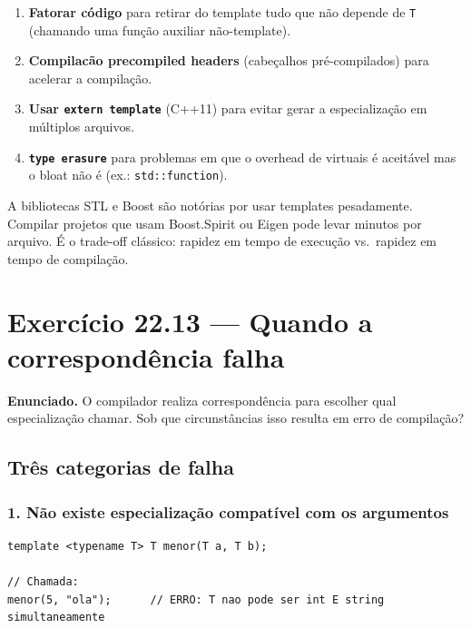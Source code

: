 \documentclass[11pt,a4paper]{article}
\begin{document}
\begin{enumerate}[leftmargin=*,itemsep=0pt]
  \item \textbf{Fatorar c\'odigo} para retirar do template tudo que n\~ao depende de \texttt{T} (chamando uma fun\c{c}\~ao auxiliar n\~ao-template).
  \item \textbf{Compilac\~ao precompiled headers} (cabe\c{c}alhos pr\'e-compilados) para acelerar a compila\c{c}\~ao.
  \item \textbf{Usar \texttt{extern template}} (C++11) para evitar gerar a especializa\c{c}\~ao em m\'ultiplos arquivos.
  \item \textbf{\texttt{type erasure}} para problemas em que o overhead de virtuais \'e aceit\'avel mas o bloat n\~ao \'e (ex.: \texttt{std::function}).
\end{enumerate}

\begin{dicadesemp}
A bibliotecas STL e Boost s\~ao not\'orias por usar templates pesadamente. Compilar projetos que usam Boost.Spirit ou Eigen pode levar minutos por arquivo. \'E o trade-off cl\'assico: rapidez em tempo de execu\c{c}\~ao vs.\ rapidez em tempo de compila\c{c}\~ao.
\end{dicadesemp}

\section{Exerc\'icio 22.13 --- Quando a correspond\^encia falha}

\begin{enunciado}
\textbf{Enunciado.} O compilador realiza correspond\^encia para escolher qual especializa\c{c}\~ao chamar. Sob que circunst\^ancias isso resulta em erro de compila\c{c}\~ao?
\end{enunciado}

\subsection*{Tr\^es categorias de falha}

\subsubsection*{1. N\~ao existe especializa\c{c}\~ao compat\'ivel com os argumentos}

\begin{lstlisting}[style=cppcode,numbers=none]
template <typename T> T menor(T a, T b);

// Chamada:
menor(5, "ola");      // ERRO: T nao pode ser int E string simultaneamente
\end{lstlisting}
\end{document}
